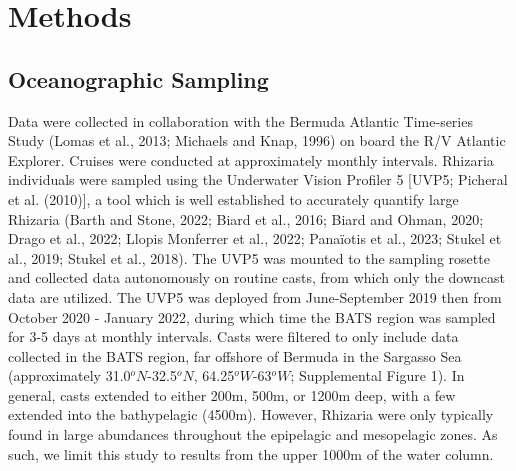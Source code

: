 \documentclass[
]{article}
\begin{document}
\hypertarget{methods}{%
\section{Methods}\label{methods}}

\hypertarget{oceanographic-sampling}{%
\subsection{Oceanographic Sampling}\label{oceanographic-sampling}}

Data were collected in collaboration with the Bermuda Atlantic
Time-series Study (Lomas et al., 2013; Michaels and Knap, 1996) on board
the R/V Atlantic Explorer. Cruises were conducted at approximately
monthly intervals. Rhizaria individuals were sampled using the
Underwater Vision Profiler 5 {[}UVP5; Picheral et al. (2010){]}, a tool
which is well established to accurately quantify large Rhizaria (Barth
and Stone, 2022; Biard et al., 2016; Biard and Ohman, 2020; Drago et
al., 2022; Llopis Monferrer et al., 2022; Panaïotis et al., 2023; Stukel
et al., 2019; Stukel et al., 2018). The UVP5 was mounted to the sampling
rosette and collected data autonomously on routine casts, from which
only the downcast data are utilized. The UVP5 was deployed from
June-September 2019 then from October 2020 - January 2022, during which
time the BATS region was sampled for 3-5 days at monthly intervals.
Casts were filtered to only include data collected in the BATS region,
far offshore of Bermuda in the Sargasso Sea (approximately
31.0\(^oN\)-32.5\(^oN\), 64.25\(^oW\)-63\(^oW\); Supplemental Figure 1).
In general, casts extended to either 200m, 500m, or 1200m deep, with a
few extended into the bathypelagic (4500m). However, Rhizaria were only
typically found in large abundances throughout the epipelagic and
mesopelagic zones. As such, we limit this study to results from the
upper 1000m of the water column.
\end{document}
